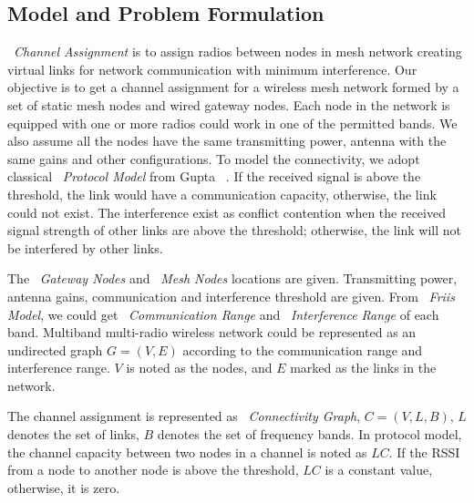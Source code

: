 \subsection{Model and Problem Formulation}
\label{subsec:problem}

~\emph{Channel Assignment} is to assign radios between nodes in mesh network creating virtual links for network communication with minimum interference.
Our objective is to get a channel assignment for a wireless mesh network formed by a set of static mesh nodes and wired gateway nodes. 
Each node in the network is equipped with one or more radios could work in one of the permitted bands. 
We also assume all the nodes have the same transmitting power, antenna with the same gains and other configurations.
To model the connectivity, we adopt classical ~\emph{Protocol Model} from Gupta ~\cite{gupta2000capacity}. If the received signal is above the threshold, the link would have a communication capacity, otherwise, the link could not exist.
The interference exist as conflict contention when the received signal strength of other links are above the threshold; otherwise, the link will not be interfered by other links.

The ~\emph{Gateway Nodes} and ~\emph{Mesh Nodes} locations are given. 
Transmitting power, antenna gains, communication and interference threshold are given. From ~\emph{Friis Model}, we could get ~\emph{Communication Range} and ~\emph{Interference Range} of each  band. 
Multiband multi-radio wireless network could be represented as an undirected graph $G=(V,E)$ according to the communication range and interference range. $V$ is noted as the nodes, and $E$ marked as the links in the network.

The channel assignment is represented as ~\emph{Connectivity Graph}, $C=(V,L,B)$, $L$ denotes the set of links, $B$ denotes the set of frequency bands. 
In protocol model, the channel capacity between two nodes in a channel is noted as $LC$. If the RSSI from a node to another node is above the threshold, $LC$ is a constant value, otherwise, it is zero. 

